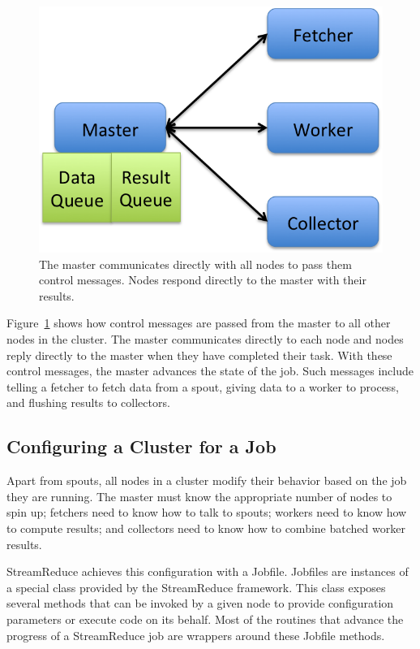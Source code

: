 \documentclass[12pt,twocolumn]{article}
\begin{document}
\begin{figure}
\includegraphics[width=\linewidth]{master-control-queue.png}
\caption{The master communicates directly with all nodes to pass them control messages. Nodes respond directly to the master with their results.}
\label{fig:mastercontrolqueue}
\end{figure}

Figure~\ref{fig:mastercontrolqueue} shows how control messages are passed from the master
to all other nodes in the cluster. The master communicates directly to each node and nodes
reply directly to the master when they have completed their task. With these control messages,
the master advances the state of the job. Such messages include telling a fetcher to fetch data
from a spout, giving data to a worker to process, and flushing results to collectors.


\subsection{Configuring a Cluster for a Job}
\label{sec:jobfile}
Apart from spouts, all nodes in a cluster modify their behavior based on the job they are
running. The master must know the appropriate number of nodes to spin up; fetchers need to
know how to talk to spouts; workers need to know how to compute results; and collectors need
to know how to combine batched worker results.

StreamReduce achieves this configuration with a Jobfile. Jobfiles are instances of a special class
provided by the StreamReduce framework. This class exposes several methods that can be invoked by a
given node to provide configuration parameters or execute code on its behalf. Most of the
routines that advance the progress of a StreamReduce job are wrappers around these Jobfile methods.
\end{document}
